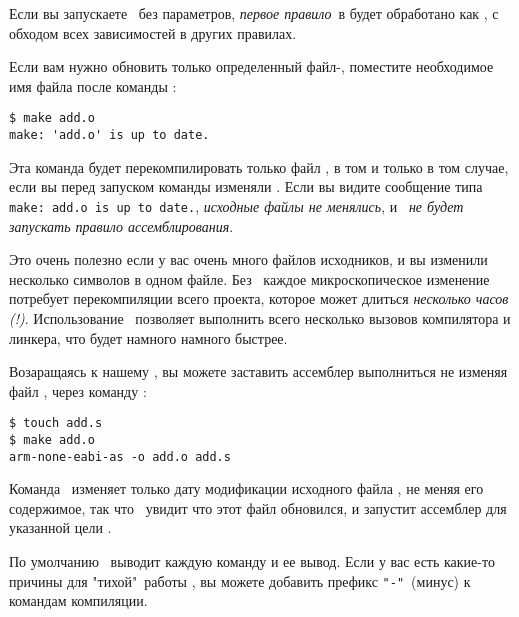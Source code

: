\begin{framed}
Если вы запускаете \ без параметров, \emph{первое правило}\ в
 будет обработано как , с обходом всех
зависимостей в других правилах. 
\end{framed}


Если вам нужно обновить только определенный файл-, поместите
необходимое имя файла после команды :

\begin{verbatim}
$ make add.o
make: 'add.o' is up to date.
\end{verbatim}

Эта команда будет перекомпилировать только файл , в том и только в
том случае, если вы перед запуском команды изменяли . Если вы
видите сообщение типа \verb|make: add.o is up to date.|, \emph{исходные файлы не
менялись}, и \ \emph{не будет запускать правило ассемблирования}.

Это очень полезно если у вас очень много файлов исходников, и вы изменили несколько символов в одном файле. Без
\ каждое
микроскопическое изменение потребует перекомпиляции всего проекта, которое может длиться 
\emph{несколько часов\,(!)}. Использование \ позволяет выполнить
всего несколько вызовов компилятора и линкера, что будет намного намного быстрее. 

Возаращаясь к нашему , вы можете заставить ассемблер выполниться не
изменяя файл , через команду :

\begin{verbatim}
$ touch add.s 
$ make add.o
arm-none-eabi-as -o add.o add.s
\end{verbatim}

Команда \ изменяет только дату модификации исходного файла
, не меняя его содержимое, так что \ увидит что этот
файл обновился, и запустит ассемблер для указанной цели .

По умолчанию \ выводит каждую команду и ее вывод. Если у вас есть
какие-то причины для "тихой"\ работы , вы можете добавить префикс 
\verb|"-"|\ (минус) к командам компиляции.  


\secup

\secdown
{}
\secup
{}
\label{kumarB}
 
\secup 
